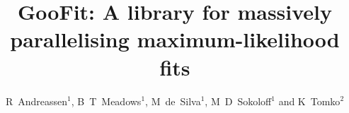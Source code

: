 \title{GooFit: A library for massively parallelising maximum-likelihood fits}

\author{R~Andreassen$^1$, B~T~Meadows$^1$, M~de~Silva$^1$, M~D~Sokoloff$^1$ and K~Tomko$^2$}
\address{$^1$ University of Cincinnati, 2600 Clifton Avenue, Cincinnati OH 45220, USA}
\address{$^2$ Ohio Supercomputer Center, 1224 Kinnear Road, Columbus OH 43212, USA}
